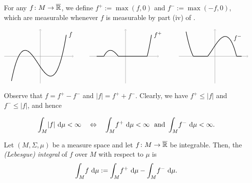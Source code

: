 For any $f\colon M\to \overline{\mathbb{R}}$, we define $f^+:=\max(f,0)$ and $f^-:=\max(-f,0)$, which are measurable whenever $f$ is measurable by part (iv) of .

\begin{equation*}
\begin{tikzpicture}[xscale=0.4,yscale=0.5]
\draw[->,thin,gray] (-5,0)--(4.6,0);
\draw[->,thin,gray] (0,-3)--(0,3);
\draw [thick,smooth,samples=100,variable=\x,domain=-4:3.6] plot(\x,{(\x+1)*(\x-3)*(\x+3)*0.13}) node[right] {$f$};
\end{tikzpicture}
\qquad\
\begin{tikzpicture}[xscale=0.4,yscale=0.5]
\draw[->,thin,gray] (-5,0)--(4.6,0);
\draw[->,thin,gray] (0,-3)--(0,3);
\draw [thick,smooth,samples=100,variable=\x,domain=-3:-1] plot(\x,{(\x+1)*(\x-3)*(\x+3)*0.13});
\draw [thick,smooth,samples=100,variable=\x,domain=3:3.6] plot(\x,{(\x+1)*(\x-3)*(\x+3)*0.13}) node[right] {$f^+$};
\draw [thick] (-4,0)--(-3,0);
\draw [thick] (-1,0)--(3,0);
\end{tikzpicture}
\qquad\
\begin{tikzpicture}[xscale=0.4,yscale=0.5]
\draw[->,thin,gray] (-5,0)--(4.6,0);
\draw[->,thin,gray] (0,-3)--(0,3);
\draw [thick,smooth,samples=100,variable=\x,domain=-4:-3] plot(\x,{-(\x+1)*(\x-3)*(\x+3)*0.13});
\draw [thick,smooth,samples=100,variable=\x,domain=-1:3] plot(\x,{-(\x+1)*(\x-3)*(\x+3)*0.13}) node[above=20pt] {$\ f^-$};
\draw [thick] (-3,0)--(-1,0);
\draw [thick] (3,0)--(3.7,0);
\end{tikzpicture}
\end{equation*}
Observe that $f=f^+-f^-$ and $|f|=f^++f^-$. Clearly, we have $f^+\leq|f|$ and $f^-\leq |f|$, and hence


\begin{equation*}
\int_{M}\!|f|\,\mathop{}\!\mathrm{d} \mu < \infty\quad \Leftrightarrow \quad \int_{M}\!f^+\,\mathop{}\!\mathrm{d} \mu < \infty\ \text{ and } \int_{M}\!f^-\,\mathop{}\!\mathrm{d} \mu < \infty.
\end{equation*}


\begin{definition}
Let $(M,\Sigma,\mu)$ be a measure space and let $f\colon M\to\overline{\mathbb{R}}$ be integrable. Then, the \emph{(Lebesgue) integral} of $f$ over $M$ with respect to $\mu$ is
\begin{equation*}
\int_{M}\!f\,\mathop{}\!\mathrm{d} \mu := \int_{M}\!f^+\,\mathop{}\!\mathrm{d} \mu -\int_{M}\!f^-\,\mathop{}\!\mathrm{d} \mu .
\end{equation*}
\end{definition}

